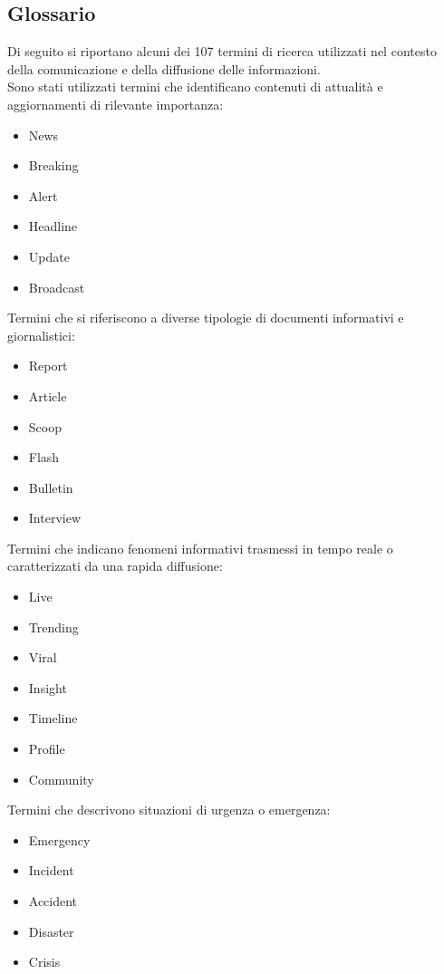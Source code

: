 \documentclass[12pt]{article}
\begin{document}
	\subsection{Glossario}
		Di seguito si riportano alcuni dei 107 termini di ricerca utilizzati nel contesto della comunicazione e della diffusione delle informazioni.\\
		Sono stati utilizzati termini che identificano contenuti di attualità e aggiornamenti di rilevante importanza:
	\begin{itemize}[label=] 
		\item News
		\item Breaking
		\item Alert
		\item Headline
		\item Update
		\item Broadcast
	\end{itemize}
	Termini che si riferiscono a diverse tipologie di documenti informativi e giornalistici:
	\begin{itemize}[label=] 
		\item Report
		\item Article
		\item Scoop
		\item Flash
		\item Bulletin
		\item Interview
	\end{itemize}
	Termini che indicano fenomeni informativi trasmessi in tempo reale o caratterizzati da una rapida diffusione:
	\begin{itemize}[label=] 
		\item Live
		\item Trending
		\item Viral
		\item Insight
		\item Timeline
		\item Profile
		\item Community
	\end{itemize}
	Termini che descrivono situazioni di urgenza o emergenza:
	\begin{itemize}[label=] 
		\item Emergency
		\item Incident
		\item Accident
		\item Disaster
		\item Crisis
	\end{itemize}
\end{document}
